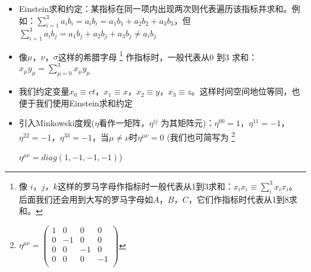 \begin{itemize}
  \item Einstein求和约定：某指标在同一项内出现两次则代表遍历该指标并求和。例如：$\sum_{i=1}^3a_i b_i =a_i b_i=a_1 b_1 +a_2 b_2 +a_3 b_3$，但$\sum_{i=1}^3a_i b_j=a_1 b_j +a_2 b_j +a_3 b_j\neq a_i b_j$
  \item 像$\mu$，$\nu$，$\sigma$这样的希腊字母
  \footnote{像 $i$，$j$，$k$这样的罗马字母作指标时一般代表从1到3求和：$x_i x_i \equiv \sum_i^3 x_i x_i$。 后面我们还会用到大写的罗马字母如$A$，$B$，$C$，它们作指标时代表从1到8求和。} 作指标时，一般代表从0 到3 求和：$x_\mu y_\mu=\sum_{\mu=0}^3 x_\mu y_\mu $
  \item 我们约定变量$x_0\equiv ct$，$x_1\equiv x$，$x_2\equiv y$，$x_3\equiv z$。这样时间空间地位等同，也便于我们使用Einstein求和约定
  \item 引入Minkowski度规($\eta$看作一矩阵，$\eta^{ij}$ 为其矩阵元)：$\eta^{00}=1$，$\eta^{11}=-1$，$\eta^{22}=-1$，$\eta^{33}=-1$，当$\mu \neq \nu$时$\eta^{\mu\nu}=0$  (我们也可简写为
  \footnote{$\eta^{\mu\nu}= \left(
       \begin{array}{cccc}
        1 & 0 & 0 & 0 \\
         0 & -1 & 0 & 0 \\
          0 & 0 & -1 & 0 \\
          0 & 0 & 0  & -1\\
        \end{array}\right)$ }


      $\eta^{\mu\nu}=diag(1,-1,-1,-1)$)
\end{itemize}

